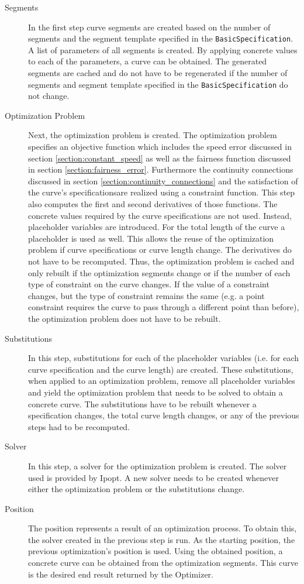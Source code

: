 \documentclass[a4paper]{article}
\begin{document}
					\begin{description}
						\item[Segments]
						In the first step curve segments are created based on the number of segments and the segment template specified in the \verb|BasicSpecification|. A list of parameters of all segments is created. By applying concrete values to each of the parameters, a curve can be obtained. The generated segments are cached and do not have to be regenerated if the number of segments and segment template specified in the \verb|BasicSpecification| do not change.
						
						\item[Optimization Problem]
						Next, the optimization problem is created. The optimization problem specifies an objective function which includes the speed error discussed in section \ref{section:constant_speed} as well as the fairness function discussed in section \ref{section:fairness_error}. Furthermore the continuity connections discussed in section \ref{section:continuity_connections} and the satisfaction of the curve's specificationsare realized using a constraint function. This step also computes the first and second derivatives of those functions. The concrete values required by the curve specifications are not used. Instead, placeholder variables are introduced. For the total length of the curve a placeholder is used as well. This allows the reuse of the optimization problem if curve specifications or curve length change. The derivatives do not have to be recomputed. Thus, the optimization problem is cached and only rebuilt if the optimization segments change or if the number of each type of constraint on the curve changes. If the value of a constraint changes, but the type of constraint remains the same (e.g. a point constraint requires the curve to pass through a different point than before), the optimization problem does not have to be rebuilt.
						
						\item[Substitutions]
						In this step, substitutions for each of the placeholder variables (i.e. for each curve specification and the curve length) are created. These substitutions, when applied to an optimization problem, remove all placeholder variables and yield the optimization problem that needs to be solved to obtain a concrete curve. The substitutions have to be rebuilt whenever a specification changes, the total curve length changes, or any of the previous steps had to be recomputed.
						
						\item[Solver]
						In this step, a solver for the optimization problem is created. The solver used is provided by Ipopt. A new solver needs to be created whenever either the optimization problem or the substitutions change.
						\item[Position]
							The position represents a result of an optimization process. To obtain this, the solver created in the previous step is run. As the starting position, the previous optimization's position is used. Using the obtained position, a concrete curve can be obtained from the optimization segments. This curve is the desired end result returned by the Optimizer.
					\end{description}
					
\end{document}
